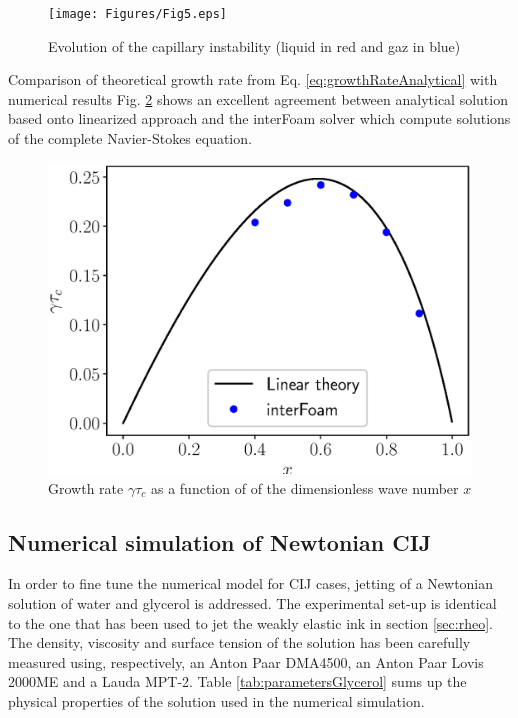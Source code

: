 \documentclass[onecolumn, 12pt]{asme2ej}
\begin{document}
\begin{figure}[t]
    \centering
    \texttt{[image: Figures/Fig5.eps]}
    \caption{Evolution of the capillary instability (liquid in red and gaz in blue)} 
    \label{fig:capillaryGrowth}
\end{figure}

Comparison of theoretical growth rate from Eq. \ref{eq:growthRateAnalytical} with numerical results Fig. \ref{fig:growthrate} shows an excellent agreement between analytical solution based onto linearized approach and the interFoam solver which compute solutions of the complete Navier-Stokes equation.

\begin{figure}[h]
    \centering
    \includegraphics[width=15cm]{Figures/Fig6.eps}
    \caption{Growth rate $\gamma \tau_c$ as a function of of the dimensionless wave number $x$}
    \label{fig:growthrate}
\end{figure}

\subsection{Numerical simulation of Newtonian CIJ}\label{sec:glycerol}
In order to fine tune the numerical model for CIJ cases, jetting of a Newtonian solution of water and glycerol is addressed. The experimental set-up is identical to the one that has been used to jet the weakly elastic ink in section \ref{sec:rheo}. The density, viscosity and surface tension of the solution has been carefully measured using, respectively, an Anton Paar DMA4500, an Anton Paar Lovis 2000ME and a Lauda MPT-2. Table \ref{tab:parametersGlycerol} sums up the physical properties of the solution used in the numerical simulation.
\end{document}
